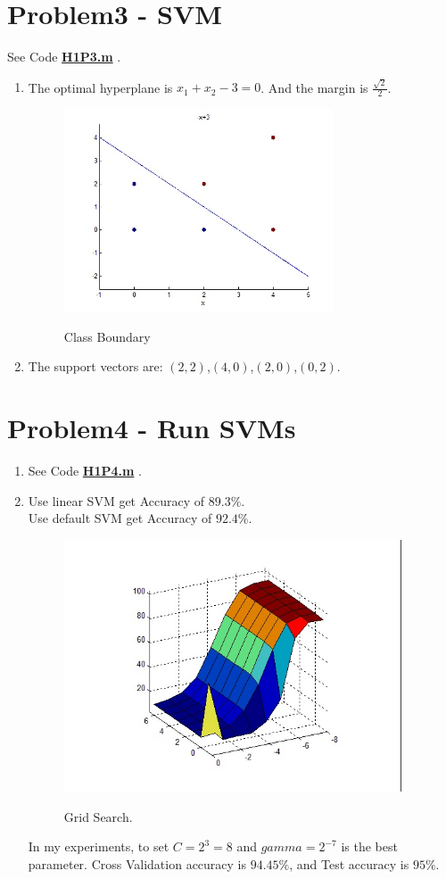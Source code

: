 \documentclass[12pt]{article}
\begin{document}
\section{Problem3 - SVM}
See Code \href{./H1P3.m}{\textbf{H1P3.m}} .
\begin{enumerate}
    \item The optimal hyperplane is $x_1+x_2-3=0$.
    And the margin is $\frac{\sqrt{2}}{2}$.
        \begin{figure}[H]
          \centering
          \includegraphics[width=8cm]{fig/3-1.jpg}\\
          \caption{Class Boundary}\label{fig1}
        \end{figure}
    \item The support vectors are: $(2,2)$,$(4,0)$,$(2,0)$,$(0,2)$. 

\end{enumerate}

\section{Problem4 - Run SVMs}
\begin{enumerate}
    \item
    See Code \href{./H1P4.m}{\textbf{H1P4.m}} .
    \item
    Use linear SVM get Accuracy of $89.3\%$. \\
    Use default SVM get Accuracy of $92.4\%$. \\
    \begin{figure}[H]
       \centering
       \includegraphics[width=10cm]{fig/svm.jpg}\\
       \caption{Grid Search.}\label{fig1}
    \end{figure}
    In my experiments, to set $C=2^3=8$ and $gamma=2^{-7}$ is the best parameter. Cross Validation accuracy is $94.45\%$, and Test accuracy is $95\%$.

\end{enumerate}
\end{document}
